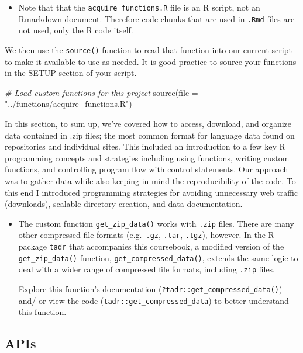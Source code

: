 \documentclass[
]{article}
\newenvironment{Shaded}{\begin{snugshade}}{\end{snugshade}}
\newcommand{\AttributeTok}[1]{\textcolor[rgb]{0.77,0.63,0.00}{#1}}
\newcommand{\CommentTok}[1]{\textcolor[rgb]{0.56,0.35,0.01}{\textit{#1}}}
\newcommand{\FunctionTok}[1]{\textcolor[rgb]{0.00,0.00,0.00}{#1}}
\newcommand{\NormalTok}[1]{#1}
\newcommand{\StringTok}[1]{\textcolor[rgb]{0.31,0.60,0.02}{#1}}
\newenvironment{rmdblock}[1]
  {\begin{shaded*}
  \begin{itemize}
  \renewcommand{\labelitemi}{
    \raisebox{-.5\height}[0pt][0pt]{
      {\setkeys{Gin}{width=2em,keepaspectratio}\texttt{[image: assets/images/\#1]}}
    }
  }
  \item
  }
  {
  \end{itemize}
  \end{shaded*}
  }
\newenvironment{rmdnote}
  {\begin{rmdblock}{note}}
  {\end{rmdblock}}
\newenvironment{rmdtip}
  {\begin{rmdblock}{tip}}
  {\end{rmdblock}}
\begin{document}
\begin{rmdtip}
Note that that the \texttt{acquire\_functions.R} file is an R script,
not an Rmarkdown document. Therefore code chunks that are used in
\texttt{.Rmd} files are not used, only the R code itself.
\end{rmdtip}

We then use the \texttt{source()} function to read that function into our current script to make it available to use as needed. It is good practice to source your functions in the SETUP section of your script.

\begin{Shaded}
\begin{Highlighting}[]
\CommentTok{\# Load custom functions for this project}
\FunctionTok{source}\NormalTok{(}\AttributeTok{file =} \StringTok{"../functions/acquire\_functions.R"}\NormalTok{)}
\end{Highlighting}
\end{Shaded}

In this section, to sum up, we've covered how to access, download, and organize data contained in .zip files; the most common format for language data found on repositories and individual sites. This included an introduction to a few key R programming concepts and strategies including using functions, writing custom functions, and controlling program flow with control statements. Our approach was to gather data while also keeping in mind the reproducibility of the code. To this end I introduced programming strategies for avoiding unnecessary web traffic (downloads), scalable directory creation, and data documentation.

\begin{rmdnote}
The custom function \texttt{get\_zip\_data()} works with \texttt{.zip}
files. There are many other compressed file formats (e.g.~\texttt{.gz},
\texttt{.tar}, \texttt{.tgz}), however. In the R package \texttt{tadr}
that accompanies this coursebook, a modified version of the
\texttt{get\_zip\_data()} function, \texttt{get\_compressed\_data()},
extends the same logic to deal with a wider range of compressed file
formats, including \texttt{.zip} files.

Explore this function's documentation
(\texttt{?tadr::get\_compressed\_data()}) and/ or view the code
(\texttt{tadr::get\_compressed\_data}) to better understand this
function.
\end{rmdnote}

\hypertarget{apis}{%
\subsection{APIs}\label{apis}}
\end{document}
